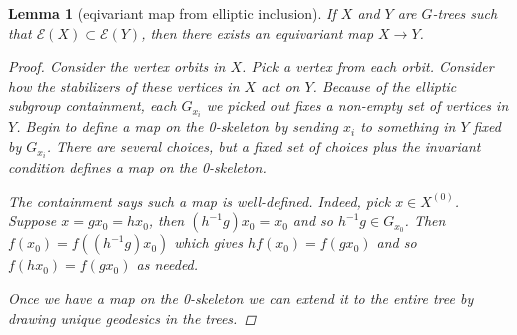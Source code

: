 \documentclass{article}
\theoremstyle{mystyle}
\newtheorem{lem}[thm]{Lemma}
\theoremstyle{remark}
\begin{document}
\begin{lem}[eqivariant map from elliptic inclusion]
    If $X$ and $Y$ are \(G\)-trees such that $\mathcal{E}(X)\subset\mathcal{E}(Y)$, then there exists an equivariant map $X\to Y$.
 
 \begin{proof}
 Consider the vertex orbits in $X$. Pick a vertex from each orbit. Consider how the stabilizers of these vertices in $X$ act on $Y$. Because of the elliptic subgroup containment, each $G_{x_i}$ we picked out fixes a non-empty set of vertices in $Y$. Begin to define a map on the 0-skeleton by sending $x_i$ to something in $Y$ fixed by $G_{x_i}$. There are several choices, but a fixed set of choices plus the invariant condition defines a map on the 0-skeleton.
 
The containment says such a map is well-defined. Indeed, pick $x \in X^{(0)}$. Suppose $x=gx_0=hx_0$, then $(h^{-1}g)x_0 = x_0$ and so $h^{-1}g \in G_{x_0}$. Then $f(x_0)=f( (h^{-1}g)x_0)$ which gives $h f(x_0) = f(gx_0)$ and so $f(hx_0)=f(gx_0)$ as needed.
 
 Once we have a map on the 0-skeleton we can extend it to the entire tree by drawing unique geodesics in the trees.
\end{proof}
\end{lem}

\end{document}
